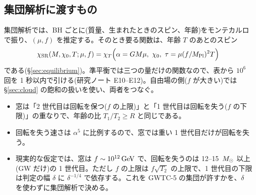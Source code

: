 \subsection{集団解析に渡すもの}

集団解析では、BH ごとに(質量、生まれたときのスピン、年齢)をモンテカルロで振り、$(\mu,f)$ を推定する。そのとき要る関数は、年齢 $T$ のあとのスピン
\begin{equation}
\chi_\mathrm{SR}(M,\chi_0,T;\mu,f)=\chi_T\Bigl(\alpha=GM\mu,\ \chi_0,\ \tau=\mu(f/\Mpl)^2T\Bigr)
\end{equation}
である(\S\ref{sec:equilibrium})。準平衡では三つの量だけの関数なので、表から $10^6$ 回を 1 秒以内で引ける(研究ノート E10--E12)。自由場の側($f$ が大きい)では \S\ref{sec:cloud} の飽和の扱いを使い、両者をつなぐ。

\begin{summary}
\begin{itemize}
\item 窓は「2 世代目は回転を保つ($f$ の上限)」と「1 世代目は回転を失う($f$ の下限)」の重なりで、年齢の比 $T_1/T_2\ge R$ と同じである。
\item 回転を失う速さは $\alpha^5$ に比例するので、窓では重い 1 世代目だけが回転を失う。
\item 現実的な仮定では、窓は $f\sim10^{12}\,\mathrm{GeV}$ で、回転を失うのは 12--15 $\,M_\odot$ 以上(GW だけ)の 1 世代目。ただし $f$ の上限は $f\sqrt{T_2}$ の上限で、1 世代目の下限は判定の幅 $\delta$ に $\delta^{-1/4}$ で依存する。これを GWTC-5 の集団が許すかを、$\delta$ を使わずに集団解析で決める。
\end{itemize}
\end{summary}
